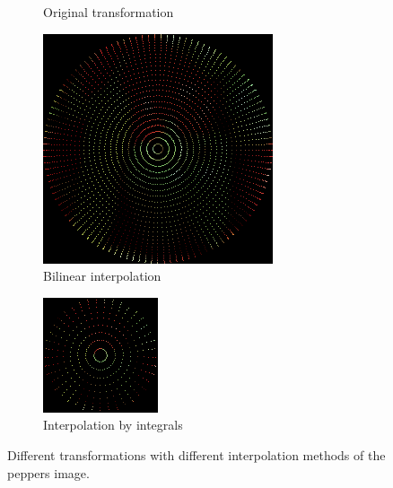 \begin{figure}[tbh]
\begin{subfigure}{.49\textwidth}
    \caption{Original transformation}
    \end{subfigure}
    \begin{subfigure}{.49\textwidth}
        \centering
    \includegraphics[width=\textwidth]{figures/pepper_bilinear.png}
    \caption{Bilinear interpolation}
    \end{subfigure}
    \begin{subfigure}{.49\textwidth}
        \centering
    \includegraphics[width=\textwidth]{figures/pepper_integral.png}
    \caption{Interpolation by integrals}
    \end{subfigure}
    \caption{Different transformations with different interpolation methods of the peppers image.}
    \label{fig:pepper_trans}
\end{figure}